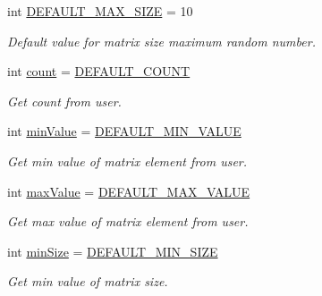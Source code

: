 \begin{DoxyCompactItemize}
int \mbox{\hyperlink{namespacegenerator_ab7780beb5ea70ea98b607e0cbc6f7fdd}{D\+E\+F\+A\+U\+L\+T\+\_\+\+M\+A\+X\+\_\+\+S\+I\+ZE}} = 10
\begin{DoxyCompactList}\small\item\em Default value for matrix size maximum random number. \end{DoxyCompactList}\item 
\mbox{\label{namespacegenerator_a57fb6bb46ceaf7e6c079c15b6b990262}} 
int \mbox{\hyperlink{namespacegenerator_a57fb6bb46ceaf7e6c079c15b6b990262}{count}} = \mbox{\hyperlink{namespacegenerator_ad47482614306598815ef0e24e3463de1}{D\+E\+F\+A\+U\+L\+T\+\_\+\+C\+O\+U\+NT}}
\begin{DoxyCompactList}\small\item\em Get count from user. \end{DoxyCompactList}\item 
\mbox{\label{namespacegenerator_a1aed69a5264581b10544330d2060af2c}} 
int \mbox{\hyperlink{namespacegenerator_a1aed69a5264581b10544330d2060af2c}{min\+Value}} = \mbox{\hyperlink{namespacegenerator_a8c4f0976fd6061b5da01305b2dd476a2}{D\+E\+F\+A\+U\+L\+T\+\_\+\+M\+I\+N\+\_\+\+V\+A\+L\+UE}}
\begin{DoxyCompactList}\small\item\em Get min value of matrix element from user. \end{DoxyCompactList}\item 
\mbox{\label{namespacegenerator_a38b196f0609e1295c246d9bb79073259}} 
int \mbox{\hyperlink{namespacegenerator_a38b196f0609e1295c246d9bb79073259}{max\+Value}} = \mbox{\hyperlink{namespacegenerator_a38e484a8c0585682f654d6312cdb4af5}{D\+E\+F\+A\+U\+L\+T\+\_\+\+M\+A\+X\+\_\+\+V\+A\+L\+UE}}
\begin{DoxyCompactList}\small\item\em Get max value of matrix element from user. \end{DoxyCompactList}\item 
\mbox{\label{namespacegenerator_aa67ea040e8eb181e958bf7767d15b297}} 
int \mbox{\hyperlink{namespacegenerator_aa67ea040e8eb181e958bf7767d15b297}{min\+Size}} = \mbox{\hyperlink{namespacegenerator_a346c332ecb6c8786ddd01a989e634777}{D\+E\+F\+A\+U\+L\+T\+\_\+\+M\+I\+N\+\_\+\+S\+I\+ZE}}
\begin{DoxyCompactList}\small\item\em Get min value of matrix size. \end{DoxyCompactList}\item 

\end{DoxyCompactItemize}
